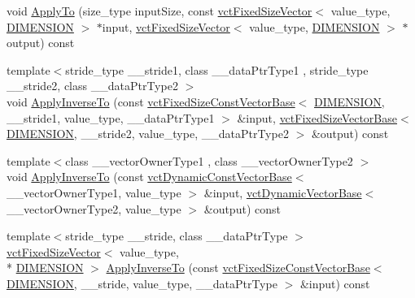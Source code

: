 \begin{DoxyCompactItemize}
\item 
void \hyperlink{classvct_frame4x4_const_base_a9c563b3b4d4b716dd264394d81c2522e}{Apply\-To} (size\-\_\-type input\-Size, const \hyperlink{classvct_fixed_size_vector}{vct\-Fixed\-Size\-Vector}$<$ value\-\_\-type, \hyperlink{classvct_frame4x4_const_base_aa9000d4539e9ab27b091692d4bd0d986a97d7212e6c46dc9acbbd11bbc573d9a0}{D\-I\-M\-E\-N\-S\-I\-O\-N} $>$ $\ast$input, \hyperlink{classvct_fixed_size_vector}{vct\-Fixed\-Size\-Vector}$<$ value\-\_\-type, \hyperlink{classvct_frame4x4_const_base_aa9000d4539e9ab27b091692d4bd0d986a97d7212e6c46dc9acbbd11bbc573d9a0}{D\-I\-M\-E\-N\-S\-I\-O\-N} $>$ $\ast$output) const 
\item 
{\footnotesize template$<$stride\-\_\-type \-\_\-\-\_\-stride1, class \-\_\-\-\_\-data\-Ptr\-Type1 , stride\-\_\-type \-\_\-\-\_\-stride2, class \-\_\-\-\_\-data\-Ptr\-Type2 $>$ }\\void \hyperlink{classvct_frame4x4_const_base_a39519237ffc72ee662e767461b66b1da}{Apply\-Inverse\-To} (const \hyperlink{classvct_fixed_size_const_vector_base}{vct\-Fixed\-Size\-Const\-Vector\-Base}$<$ \hyperlink{classvct_frame4x4_const_base_aa9000d4539e9ab27b091692d4bd0d986a97d7212e6c46dc9acbbd11bbc573d9a0}{D\-I\-M\-E\-N\-S\-I\-O\-N}, \-\_\-\-\_\-stride1, value\-\_\-type, \-\_\-\-\_\-data\-Ptr\-Type1 $>$ \&input, \hyperlink{classvct_fixed_size_vector_base}{vct\-Fixed\-Size\-Vector\-Base}$<$ \hyperlink{classvct_frame4x4_const_base_aa9000d4539e9ab27b091692d4bd0d986a97d7212e6c46dc9acbbd11bbc573d9a0}{D\-I\-M\-E\-N\-S\-I\-O\-N}, \-\_\-\-\_\-stride2, value\-\_\-type, \-\_\-\-\_\-data\-Ptr\-Type2 $>$ \&output) const 
\item 
{\footnotesize template$<$class \-\_\-\-\_\-vector\-Owner\-Type1 , class \-\_\-\-\_\-vector\-Owner\-Type2 $>$ }\\void \hyperlink{classvct_frame4x4_const_base_aab05656b39bd5a81b380f6aeb7155106}{Apply\-Inverse\-To} (const \hyperlink{classvct_dynamic_const_vector_base}{vct\-Dynamic\-Const\-Vector\-Base}$<$ \-\_\-\-\_\-vector\-Owner\-Type1, value\-\_\-type $>$ \&input, \hyperlink{classvct_dynamic_vector_base}{vct\-Dynamic\-Vector\-Base}$<$ \-\_\-\-\_\-vector\-Owner\-Type2, value\-\_\-type $>$ \&output) const 
\item 
{\footnotesize template$<$stride\-\_\-type \-\_\-\-\_\-stride, class \-\_\-\-\_\-data\-Ptr\-Type $>$ }\\\hyperlink{classvct_fixed_size_vector}{vct\-Fixed\-Size\-Vector}$<$ value\-\_\-type, \\*
\hyperlink{classvct_frame4x4_const_base_aa9000d4539e9ab27b091692d4bd0d986a97d7212e6c46dc9acbbd11bbc573d9a0}{D\-I\-M\-E\-N\-S\-I\-O\-N} $>$ \hyperlink{classvct_frame4x4_const_base_afad69572e81f133c73c3c2ebf12e5189}{Apply\-Inverse\-To} (const \hyperlink{classvct_fixed_size_const_vector_base}{vct\-Fixed\-Size\-Const\-Vector\-Base}$<$ \hyperlink{classvct_frame4x4_const_base_aa9000d4539e9ab27b091692d4bd0d986a97d7212e6c46dc9acbbd11bbc573d9a0}{D\-I\-M\-E\-N\-S\-I\-O\-N}, \-\_\-\-\_\-stride, value\-\_\-type, \-\_\-\-\_\-data\-Ptr\-Type $>$ \&input) const 

\end{DoxyCompactItemize}
